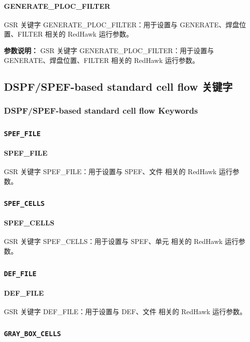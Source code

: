 \paragraph*{GENERATE_PLOC_FILTER}

GSR 关键字 GENERATE_PLOC_FILTER：用于设置与 GENERATE、焊盘位置、FILTER 相关的 RedHawk 运行参数。

\textbf{参数说明：}
GSR 关键字 GENERATE\_PLOC\_FILTER：用于设置与 GENERATE、焊盘位置、FILTER 相关的 RedHawk 运行参数。

\subsection{DSPF/SPEF-based standard cell flow 关键字}
\subsubsection*{DSPF/SPEF-based standard cell flow Keywords}

\subsubsection{\texttt{SPEF_FILE}}
\paragraph*{SPEF_FILE}

GSR 关键字 SPEF_FILE：用于设置与 SPEF、文件 相关的 RedHawk 运行参数。

\subsubsection{\texttt{SPEF_CELLS}}
\paragraph*{SPEF_CELLS}

GSR 关键字 SPEF_CELLS：用于设置与 SPEF、单元 相关的 RedHawk 运行参数。

\subsubsection{\texttt{DEF_FILE}}
\paragraph*{DEF_FILE}

GSR 关键字 DEF_FILE：用于设置与 DEF、文件 相关的 RedHawk 运行参数。

\subsubsection{\texttt{GRAY_BOX_CELLS}}
